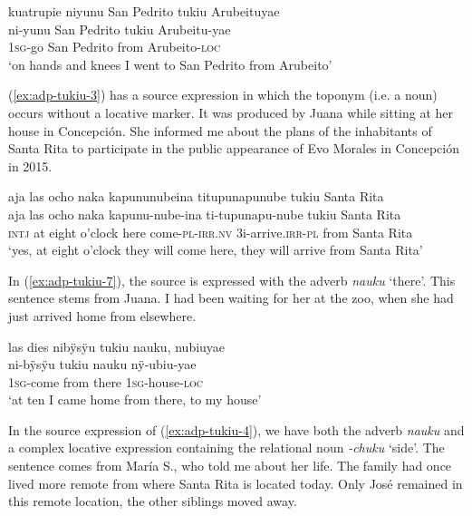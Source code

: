 \ea\label{ex:adp-tukiu-1}
\begingl
\glpreamble kuatrupie niyunu San Pedrito tukiu Arubeituyae\\
 ni-yunu {San Pedrito} tukiu Arubeitu-yae\\
 1\textsc{sg}-go {San Pedrito} from Arubeito-\textsc{loc}\\
\glft ‘on hands and knees I went to San Pedrito from Arubeito’
\endgl
\trailingcitation{[ump-p110815sf.303]}
\xe

(\ref{ex:adp-tukiu-3}) has a source expression in which the toponym (i.e. a noun) occurs without a locative marker. It was produced by Juana while sitting at her house in Concepción. She informed me about the plans of the inhabitants of Santa Rita to participate in the public appearance of Evo Morales in Concepción in 2015.

\ea\label{ex:adp-tukiu-3}
\begingl
\glpreamble aja las ocho naka kapununubeina titupunapunube tukiu Santa Rita\\
\gla aja {las ocho} naka kapunu-nube-ina ti-tupunapu-nube tukiu {Santa Rita}\\
\glb \textsc{intj} {at eight o’clock} here come-\textsc{pl}-\textsc{irr.nv} 3i-arrive.\textsc{irr}-\textsc{pl} from {Santa Rita}\\
\glft ‘yes, at eight o’clock they will come here, they will arrive from Santa Rita’
\endgl
\trailingcitation{[jxx-p150920l.078]}
\xe
{}

In (\ref{ex:adp-tukiu-7}), the source is expressed with the adverb \textit{nauku} ‘there’. This sentence stems from Juana. I had been waiting for her at the zoo, when she had just arrived home from elsewhere.

\ea\label{ex:adp-tukiu-7}
\begingl
\glpreamble las dies nibÿsÿu tukiu nauku, nubiuyae\\
 ni-bÿsÿu tukiu nauku nÿ-ubiu-yae\\
 1\textsc{sg}-come from there 1\textsc{sg}-house-\textsc{loc}\\
\glft ‘at ten I came home from there, to my house’
\endgl
\trailingcitation{[jxx-p110923l-2.043]}
\xe

In the source expression of (\ref{ex:adp-tukiu-4}), we have both the adverb \textit{nauku} and a complex locative expression containing the relational noun \textit{-chuku} ‘side’. The sentence comes from María S., who told me about her life. The family had once lived more remote from where Santa Rita is located today. Only José remained in this remote location, the other siblings moved away. 

